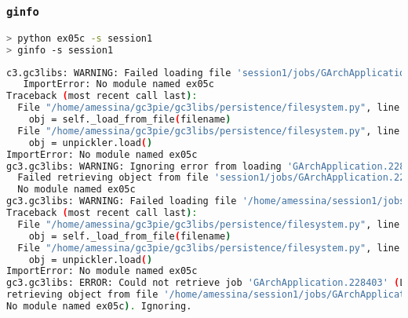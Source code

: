 \documentclass[english,serif,mathserif,xcolor=pdftex,dvipsnames,table]{beamer}
\begin{document}
\begin{frame}[fragile]
  \frametitle{\texttt{ginfo} }
  \begin{lstlisting}[language=sh,basicstyle=\tt\tiny]
> python ex05c -s session1
> ginfo -s session1
\end{lstlisting}
\pause  \begin{lstlisting}[language=sh,basicstyle=\tt\tiny]
c3.gc3libs: WARNING: Failed loading file 'session1/jobs/GArchApplication.228403':
   ImportError: No module named ex05c
Traceback (most recent call last):
  File "/home/amessina/gc3pie/gc3libs/persistence/filesystem.py", line 115, in load
    obj = self._load_from_file(filename)
  File "/home/amessina/gc3pie/gc3libs/persistence/filesystem.py", line 92, in _load_from_file
    obj = unpickler.load()
ImportError: No module named ex05c
gc3.gc3libs: WARNING: Ignoring error from loading 'GArchApplication.228403':
  Failed retrieving object from file 'session1/jobs/GArchApplication.228403': ImportError:
  No module named ex05c
gc3.gc3libs: WARNING: Failed loading file '/home/amessina/session1/jobs/GArchApplication.228403': ImportError: No module named ex05c
Traceback (most recent call last):
  File "/home/amessina/gc3pie/gc3libs/persistence/filesystem.py", line 115, in load
    obj = self._load_from_file(filename)
  File "/home/amessina/gc3pie/gc3libs/persistence/filesystem.py", line 92, in _load_from_file
    obj = unpickler.load()
ImportError: No module named ex05c
gc3.gc3libs: ERROR: Could not retrieve job 'GArchApplication.228403' (LoadError: Failed
retrieving object from file '/home/amessina/session1/jobs/GArchApplication.228403': ImportError:
No module named ex05c). Ignoring.
  \end{lstlisting}
\end{frame}
\end{document}

